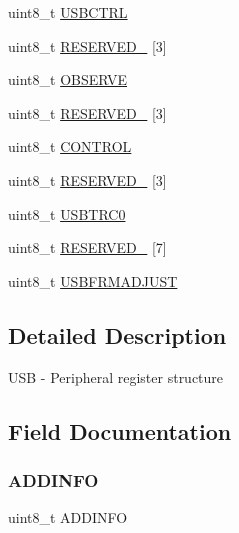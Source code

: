 \begin{DoxyCompactItemize}
\begin{tabbing}
\end{tabbing}\item 
uint8\+\_\+t \hyperlink{struct_u_s_b___mem_map_ad8f50417f356298d1ee6237db0aadbbc}{U\+S\+B\+C\+T\+RL}
\item 
uint8\+\_\+t \hyperlink{struct_u_s_b___mem_map_a16bcb91413a3db4481d7d500e8e6f82b}{R\+E\+S\+E\+R\+V\+E\+D\+\_} \mbox{[}3\mbox{]}
\item 
uint8\+\_\+t \hyperlink{struct_u_s_b___mem_map_a4d4155ad45912de6f47166b4268fed6f}{O\+B\+S\+E\+R\+VE}
\item 
uint8\+\_\+t \hyperlink{struct_u_s_b___mem_map_a88d2f4b5276717d52836ada8b48997cf}{R\+E\+S\+E\+R\+V\+E\+D\+\_} \mbox{[}3\mbox{]}
\item 
uint8\+\_\+t \hyperlink{struct_u_s_b___mem_map_a07245e0c99405baca05af69e6890b05b}{C\+O\+N\+T\+R\+OL}
\item 
uint8\+\_\+t \hyperlink{struct_u_s_b___mem_map_a3d696ac9cc19fd1715dfaa4d8b0871ae}{R\+E\+S\+E\+R\+V\+E\+D\+\_} \mbox{[}3\mbox{]}
\item 
uint8\+\_\+t \hyperlink{struct_u_s_b___mem_map_a92ef0513e19b2f5c6f57277430fdfc05}{U\+S\+B\+T\+R\+C0}
\item 
uint8\+\_\+t \hyperlink{struct_u_s_b___mem_map_aad6d5cb712dabba62eea5adf66b4f58e}{R\+E\+S\+E\+R\+V\+E\+D\+\_} \mbox{[}7\mbox{]}
\item 
uint8\+\_\+t \hyperlink{struct_u_s_b___mem_map_aa4fe940e858c95bfc35a6a30038e2119}{U\+S\+B\+F\+R\+M\+A\+D\+J\+U\+ST}
\end{DoxyCompactItemize}


\subsection{Detailed Description}
U\+SB -\/ Peripheral register structure 

\subsection{Field Documentation}
\mbox{\label{struct_u_s_b___mem_map_aa53fb603c9949324b88be8514f856671}} 
\subsubsection{\texorpdfstring{A\+D\+D\+I\+N\+FO}{ADDINFO}}
{\footnotesize\ttfamily uint8\+\_\+t A\+D\+D\+I\+N\+FO}

